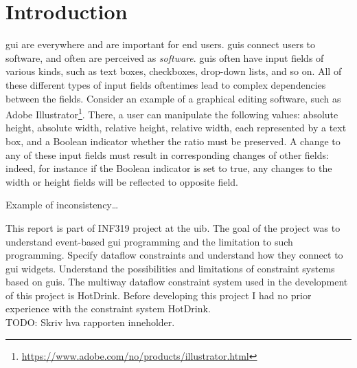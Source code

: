 \chapter{Introduction}

\gls{gui} are everywhere and are important for end users. \gls{gui}s connect users to software, and often are perceived as \emph{software}. \gls{gui}s often have input fields of various kinds, such as text boxes, checkboxes, drop-down lists, and so on. All of these different types of input fields oftentimes lead to complex dependencies between the fields. Consider an example of a graphical editing software, such as Adobe Illustrator\footnote{\url{https://www.adobe.com/no/products/illustrator.html}}. There, a user can manipulate the following values: absolute height, absolute width, relative height, relative width, each represented by a text box, and a Boolean indicator whether the ratio must be preserved. A change to any of these input fields must result in corresponding changes of other fields: indeed, for instance if the Boolean indicator is set to true, any changes to the width or height fields will be reflected to opposite field.

Example of inconsistency…



This report is part of INF319 project at the \gls{uib}. The goal of the project was to understand event-based \gls{gui} programming and the limitation to such programming. Specify dataflow constraints and understand how they connect to \gls{gui} widgets. Understand the possibilities and limitations of constraint systems based on \gls{gui}s. The multiway dataflow constraint system used in the development of this project is HotDrink. Before developing this project I had no prior experience with the constraint system HotDrink. 
\\TODO: Skriv hva rapporten inneholder.
